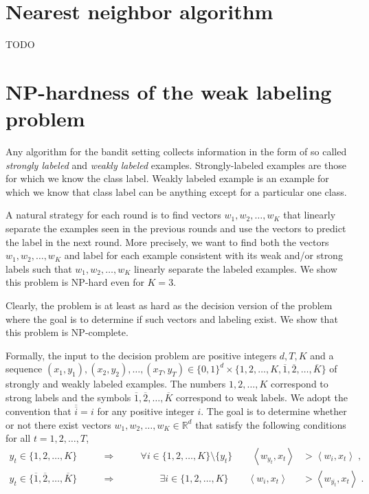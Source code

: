 \documentclass[12pt]{article}
\newcommand{\R}{\mathbb{R}}  %
\newcommand{\ip}[2]{\left\langle #1, #2 \right\rangle} %
\begin{document}
\section{Nearest neighbor algorithm}

TODO


\section{NP-hardness of the weak labeling problem}

Any algorithm for the bandit setting collects information in the form of so
called \emph{strongly labeled} and \emph{weakly labeled} examples.
Strongly-labeled examples are those for which we know the class label. Weakly
labeled example is an example for which we know that class label can be anything
except for a particular one class.

A natural strategy for each round is to find vectors $w_1, w_2, \dots, w_K$ that
linearly separate the examples seen in the previous rounds and use the vectors
to predict the label in the next round. More precisely, we want to find both the
vectors $w_1, w_2, \dots, w_K$ and label for each example consistent with its
weak and/or strong labels such that $w_1, w_2, \dots, w_K$ linearly separate the
labeled examples. We show this problem is NP-hard even for $K=3$.

Clearly, the problem is at least as hard as the decision version of the problem
where the goal is to determine if such vectors and labeling exist. We show that
this problem is NP-complete.

Formally, the input to the decision problem are positive integers $d, T, K$ and
a sequence $(x_1, y_1), (x_2, y_2), \dots, (x_T, y_T) \in \{0,1\}^d \times
\{1,2,\dots,K, \overline{1}, \overline{2}, \dots, \overline{K}\}$ of strongly
and weakly labeled examples. The numbers $1,2,\dots,K$ correspond to strong
labels and the symbols $\overline{1}, \overline{2}, \dots, \overline{K}$
correspond to weak labels. We adopt the convention that $\overline{\overline{i}}
= i$ for any positive integer $i$. The goal is to determine whether or not there
exist vectors $w_1, w_2, \dots, w_K \in \R^d$ that satisfy the following
conditions for all $t=1,2,\dots,T$,
\begin{align*}
y_t \in \{1,2,\dots,K\} \qquad & \Longrightarrow \qquad & \forall i \in \{1,2,\dots,K\} \setminus \{y_t\} \qquad \ip{w_{y_t}}{x_t} & > \ip{w_i}{x_t} \; , \\
y_t \in \{\overline{1}, \overline{2},\dots, \overline{K}\} \qquad & \Longrightarrow & \qquad \exists i \in \{1,2,\dots,K\} \qquad \ip{w_i}{x_t} & > \ip{w_{\overline{y_t}}}{x_t} \; .
\end{align*}
\end{document}
